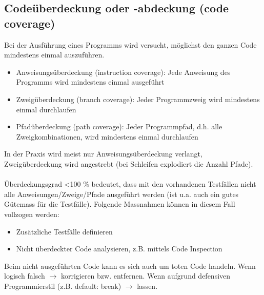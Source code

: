 \subsection{Codeüberdeckung oder -abdeckung (code coverage)}
Bei der Ausführung eines Programms wird versucht, möglichst den ganzen
Code mindestens einmal auszuführen.
\begin{itemize}
    \item Anweisungsüberdeckung (instruction coverage): Jede Anweisung des Programms wird mindestens einmal ausgeführt
    \item Zweigüberdeckung (branch coverage): Jeder Programmzweig wird mindestens einmal durchlaufen
    \item Pfadüberdeckung (path coverage): Jeder Programmpfad, d.h. alle Zweigkombinationen, wird mindestens einmal durchlaufen
\end{itemize}
In der Praxis wird meist nur Anweisungsüberdeckung verlangt,
Zweigüberdeckung wird angestrebt (bei Schleifen explodiert die Anzahl Pfade).\\\\
Überdeckungsgrad \textless 100 \% bedeutet, dass mit den vorhandenen Testfällen nicht alle Anweisungen/Zweige/Pfade ausgeführt werden (ist u.a. auch ein gutes Gütemass für die Testfälle). Folgende Massnahmen können in diesem Fall vollzogen werden: 
\begin{itemize}
    \item Zusätzliche Testfälle definieren
    \item Nicht überdeckter Code analysieren, z.B. mittels Code Inspection
\end{itemize}
Beim nicht ausgeführten Code kann es sich auch um toten Code handeln. Wenn logisch falsch $\rightarrow$ korrigieren bzw. entfernen. Wenn aufgrund defensiven Programmierstil (z.B. default: break) $\rightarrow$ lassen.
